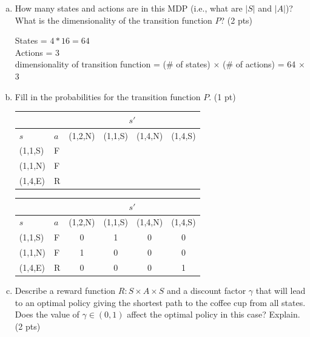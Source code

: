 \documentclass[12pt]{article}
\begin{document}
\begin{enumerate}[a)]
\item  How many states and actions are in this MDP (i.e., what are $|S|$ and $|A|$)? What is the dimensionality of the transition function $P$? (2 pts)

\begin{solution}
States = $4*16 = 64$ \\
Actions = 3 \\
dimensionality of transition function = (\# of states) $\times$ (\# of actions) = 64 $\times$ 3
\end{solution}

\item Fill in the probabilities for the transition function $P$. (1 pt)\\
  \begin{center}
    \begin{tabular}{|l|l||c|c|c|c|}\hline
      \multicolumn{2}{|c|}{} &
                               \multicolumn{4}{|c|}{$s'$}\\\hline
      $s$ & $a$ & (1,2,N) & (1,1,S) & (1,4,N) & (1,4,S)\\\hline
      (1,1,S) & F & & & &\\ \hline
      (1,1,N) & F & & & &\\ \hline
      (1,4,E) & R & & & &\\ \hline
    \end{tabular}
  \end{center}

\begin{solution}
\begin{center}
    \begin{tabular}{|l|l||c|c|c|c|}\hline
      \multicolumn{2}{|c|}{} &
                               \multicolumn{4}{|c|}{$s'$}\\\hline
      $s$ & $a$ & (1,2,N) & (1,1,S) & (1,4,N) & (1,4,S)\\\hline
      (1,1,S) & F & 0 & 1 & 0 & 0 \\ \hline
      (1,1,N) & F & 1 & 0 & 0 & 0 \\ \hline
      (1,4,E) & R & 0 & 0 & 0 & 1 \\ \hline
    \end{tabular}
  \end{center}
\end{solution}

\item Describe a reward function $R : S \times A \times S$ and a discount factor $\gamma$ that will lead to an optimal policy giving the shortest path to the coffee cup from all states. Does the value of $\gamma \in (0,1)$ affect the optimal policy in this case? Explain. (2 pts)


\end{enumerate}
\end{document}
